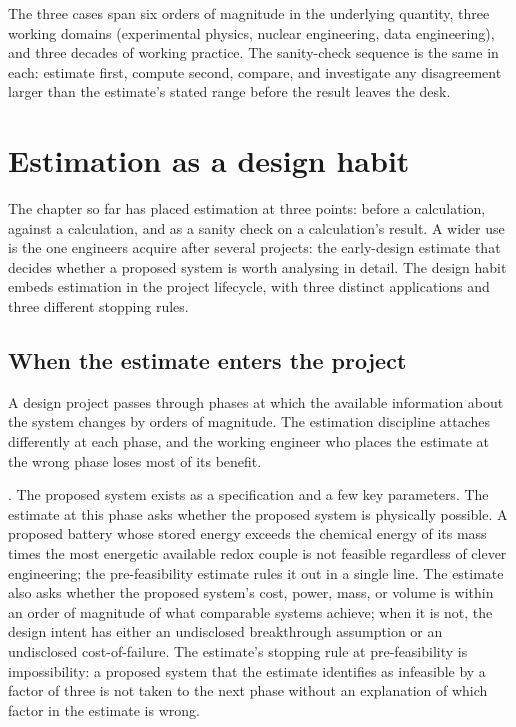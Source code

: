 The three cases span six orders of magnitude in the underlying
quantity, three working domains (experimental physics, nuclear
engineering, data engineering), and three decades of working
practice. The sanity-check sequence is the same in each: estimate
first, compute second, compare, and investigate any disagreement
larger than the estimate's stated range before the result leaves
the desk.

\section{Estimation as a design habit}

The chapter so far has placed estimation at three points: before a
calculation, against a calculation, and as a sanity check on a
calculation's result. A wider use is the one engineers acquire after
several projects: the early-design estimate that decides whether a
proposed system is worth analysing in detail. The design habit
embeds estimation in the project lifecycle, with three distinct
applications and three different stopping rules.

\subsection{When the estimate enters the project}

A design project passes through phases at which the available
information about the system changes by orders of magnitude. The
estimation discipline attaches differently at each phase, and the
working engineer who places the estimate at the wrong phase loses
most of its benefit.

. The proposed system exists as a
specification and a few key parameters. The estimate at this phase
asks whether the proposed system is physically possible. A
proposed battery whose stored energy exceeds the chemical energy
of its mass times the most energetic available redox couple is
not feasible regardless of clever engineering; the pre-feasibility
estimate rules it out in a single line. The estimate also asks
whether the proposed system's cost, power, mass, or volume is
within an order of magnitude of what comparable systems achieve;
when it is not, the design intent has either an undisclosed
breakthrough assumption or an undisclosed cost-of-failure. The
estimate's stopping rule at pre-feasibility is impossibility: a
proposed system that the estimate identifies as infeasible by a
factor of three is not taken to the next phase without an
explanation of which factor in the estimate is wrong.

